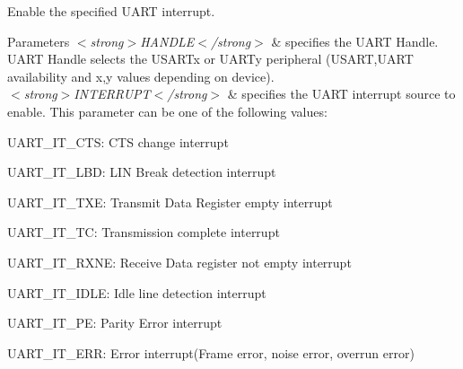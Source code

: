 Enable the specified U\-A\-R\-T interrupt. 


\begin{DoxyParams}{Parameters}
{\em $<$strong$>$\-H\-A\-N\-D\-L\-E$<$/strong$>$} & specifies the U\-A\-R\-T Handle. U\-A\-R\-T Handle selects the U\-S\-A\-R\-Tx or U\-A\-R\-Ty peripheral (U\-S\-A\-R\-T,U\-A\-R\-T availability and x,y values depending on device). \\
\hline
{\em $<$strong$>$\-I\-N\-T\-E\-R\-R\-U\-P\-T$<$/strong$>$} & specifies the U\-A\-R\-T interrupt source to enable. This parameter can be one of the following values\-: \begin{DoxyItemize}
\item U\-A\-R\-T\-\_\-\-I\-T\-\_\-\-C\-T\-S\-: C\-T\-S change interrupt \item U\-A\-R\-T\-\_\-\-I\-T\-\_\-\-L\-B\-D\-: L\-I\-N Break detection interrupt \item U\-A\-R\-T\-\_\-\-I\-T\-\_\-\-T\-X\-E\-: Transmit Data Register empty interrupt \item U\-A\-R\-T\-\_\-\-I\-T\-\_\-\-T\-C\-: Transmission complete interrupt \item U\-A\-R\-T\-\_\-\-I\-T\-\_\-\-R\-X\-N\-E\-: Receive Data register not empty interrupt \item U\-A\-R\-T\-\_\-\-I\-T\-\_\-\-I\-D\-L\-E\-: Idle line detection interrupt \item U\-A\-R\-T\-\_\-\-I\-T\-\_\-\-P\-E\-: Parity Error interrupt \item U\-A\-R\-T\-\_\-\-I\-T\-\_\-\-E\-R\-R\-: Error interrupt(\-Frame error, noise error, overrun error) \end{DoxyItemize}
\\
\hline
\end{DoxyParams}

